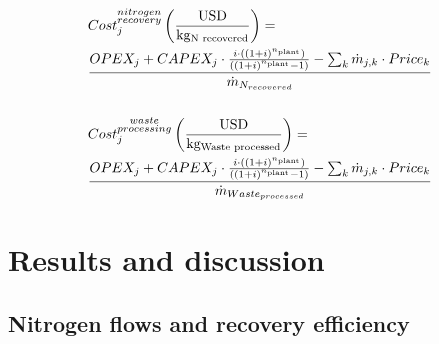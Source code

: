 \begin{refsection}[referencesCh6]
\begin{align}
& Cost_{j}^{\substack{nitrogen\\recovery}} \left(\frac{\text{USD}}{\text{kg\textsubscript{N recovered}}}\right) = \nonumber \\
& \frac{OPEX_{j}+CAPEX_{j} \cdot \frac{i \cdot \left( \left(1+i\right)^{n_{\text{plant}}} \right)}{\left( \left( 1+i\right)^{n_{\text{plant}}} -1 \right) } -\sum_{k}{\dot{m}_{j,k} \cdot Price_{k}}}{{\dot{m}_{N_{recovered}}}} \label{eq:NRecCost} \\
\nonumber \\
& Cost_{j}^ {\substack{waste\\processing}} \left(\frac{\text{USD}}{\text{kg\textsubscript{Waste processed}}}\right) = \nonumber \\
& \frac{OPEX_{j}+CAPEX_{j} \cdot \frac{i \cdot \left( \left(1+i\right)^{n_{\text{plant}}} \right)}{\left( \left( 1+i\right)^{n_{\text{plant}}} -1 \right) } -\sum_{k}{\dot{m}_{j,k} \cdot Price_{k}}}{\dot{m}_{Waste_{processed}}} \label{eq:WasteProcCost}
\end{align}



\section{Results and discussion}
\subsection{Nitrogen flows and recovery efficiency}
%


\end{refsection}
